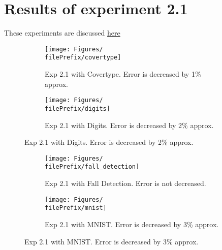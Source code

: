 
\newcommand{\major}{2}
\newcommand{\minor}{1}

\newcommand{\undPrefix}{\major_\minor}
\newcommand{\dotPrefix}{\major.\minor}
\newcommand{\scoPrefix}{\major-\minor}
\newcommand{\filePrefix}{\undPrefix}

\chapter{Results of experiment \dotPrefix} %


\label{Appendix\scoPrefix} %
These experiments are discussed \hyperref[disc:h2]{here}

\begin{figure}[ht]
  \centering
  \begin{subfigure}[t]{0.5\linewidth}
    \centering\captionsetup{width=.8\linewidth}\texttt{[image: Figures/\\filePrefix/covertype]}
    \caption{Exp 2.1 with Covertype. Error is decreased by 1\% approx.}
    \label{fig:\undPrefix_covertype}
  \end{subfigure}%
  \begin{subfigure}[t]{0.5\linewidth}
    \centering\captionsetup{width=.8\linewidth}\texttt{[image: Figures/\\filePrefix/digits]}
    \caption{Exp 2.1 with Digits. Error is decreased by 2\% approx.}
    \label{fig:\undPrefix_digits}
  \end{subfigure}
\end{figure}


\begin{figure}[ht]
  \centering
  \begin{subfigure}[t]{0.5\linewidth}
    \centering\captionsetup{width=.8\linewidth}\texttt{[image: Figures/\\filePrefix/fall\_detection]}
    \caption{Exp 2.1 with Fall Detection. Error is not decreased.}
    \label{fig:\undPrefix_fall_detection}
  \end{subfigure}%
  \begin{subfigure}[t]{0.5\linewidth}
    \centering\captionsetup{width=.8\linewidth}\texttt{[image: Figures/\\filePrefix/mnist]}
    \caption{Exp 2.1 with MNIST. Error is decreased by 3\% approx.}
    \label{fig:\undPrefix_mnist}
  \end{subfigure}
\end{figure}


